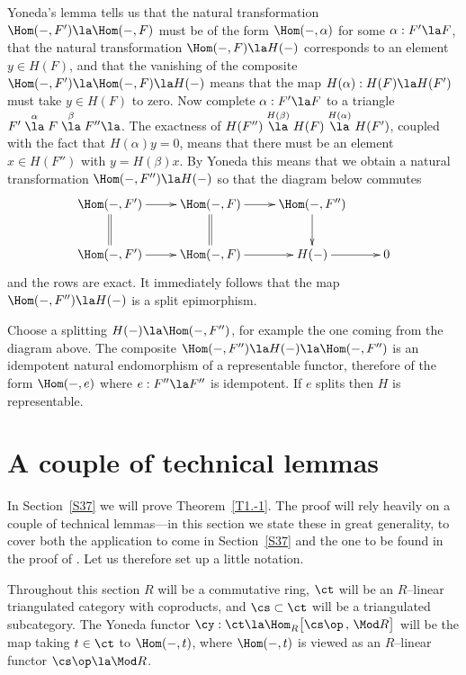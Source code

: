 \documentclass[11pt]{amsart}
\begin{document}
Yoneda's lemma tells us that the natural transformation
$\Hom(-,F')\la \Hom(-,F)$ must be of the form
$\Hom(-,\alpha)$ for some $\alpha:F'\la F$, that the natural
transformation $\Hom(-,F)\la H(-)$ corresponds to an element
$y\in H(F)$, and that the vanishing
of the composite $\Hom(-,F')\la\Hom(-,F)\la H(-)$
means that the map $H(\alpha):H(F)\la H(F')$ must take
$y\in H(F)$ to zero. Now complete $\alpha:F'\la F$ to a triangle
$F'\stackrel{\alpha}\la F\stackrel{\beta}\la F''\la$.
The exactness of
$H(F'')\stackrel{H(\beta)}\la H(F)\stackrel{H(\alpha)}\la H(F')$,
coupled with the fact that $H(\alpha)y=0$, 
means that there must be an element $x\in H(F'')$ with
$y=H(\beta)x$.
By Yoneda this means that we obtain a natural transformation
$\Hom(-,F'')\la H(-)$ so that the
diagram below commutes
\[\xymatrix{
  \Hom(-,F')\ar[r]\ar@{=}[d] & \Hom(-,F)\ar[r]\ar@{=}[d]  & \Hom(-,F'')\ar[d]& \\
\Hom(-,F')\ar[r] & \Hom(-,F)\ar[r] & H(-)\ar[r] &  0
}\]
and the rows are exact. It immediately follows that the map
$\Hom(-,F'')\la H(-)$ is a split epimorphism.

Choose a splitting $H(-)\la \Hom(-,F'')$, for example the one
coming from the diagram above. The composite
$\Hom(-,F'')\la H(-)\la\Hom(-,F'')$ is an idempotent
natural endomorphism of a representable functor, therefore
of the form $\Hom(-,e)$ where $e:F''\la F''$ is idempotent.
If $e$ splits then $H$ is representable.
\eprf





\section{A couple of technical lemmas}
\label{S997}

In Section~\ref{S37} we will prove Theorem~\ref{T1.-1}. The proof
will rely heavily on
a couple of technical lemmas---in this section
we state these in great generality, to
cover both the application to come in Section~\ref{S37}
and the one to be found in the proof
of \cite[Theorem~4.6]{Neeman18}. Let us therefore set
up a little notation.

Throughout this section $R$ will be a commutative
ring, $\ct$ will be an $R$--linear triangulated category with
coproducts, and $\cs\subset\ct$
will be a triangulated subcategory.
The Yoneda functor $\cy:\ct\la\Hom_R^{}\big[\cs\op\,,\,\Mod R\big]$ will
be the map taking $t\in\ct$ to $\Hom(-,t)$, where $\Hom(-,t)$ is
viewed as an
$R$--linear functor $\cs\op\la\Mod R$.
\end{document}

